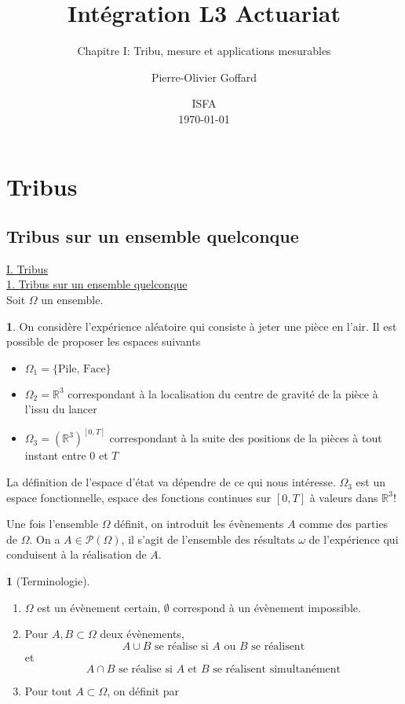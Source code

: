\documentclass[8pt,notheorems]{beamer}
\title[]{Intégration L3 Actuariat}
\subtitle{Chapitre I: Tribu, mesure et applications mesurables}
\author{Pierre-Olivier Goffard}
\institute{
	   Université de Lyon 1\\
	ISFA\\
	   \texttt{pierre-olivier.goffard@univ-lyon1.fr}
	  }
\date{
ISFA\\
\today}
\def \R{\mathbb R}
\theoremstyle{definition}
\newtheorem{definition}{\translate{Definition}}
\theoremstyle{example}
\newtheorem{example}{\translate{Exemple}}
\theoremstyle{mystyle}
\theoremstyle{plain}
\begin{document}
\frame{\titlepage}


\section{Tribus}
\subsection{Tribus sur un ensemble quelconque}
\begin{frame}[allowframebreaks]
\underline{I. Tribus}\\

\underline{1. Tribus sur un ensemble quelconque}\\
Soit $\Omega$ un ensemble. 
\begin{example}
On considère l'expérience aléatoire qui consiste à jeter une pièce en l'air. Il est possible de proposer les espaces suivants
\begin{itemize}
    \item $\Omega_1 = \{\text{Pile, Face}\}$
    \item $\Omega_2 = \R^3$ correspondant à la localisation du centre de gravité de la pièce à l'issu du lancer
    \item $\Omega_3 = \left(\R^{3}\right)^{[0,T]}$ correspondant à la suite des positions de la pièces à tout instant entre $0$ et $T$
\end{itemize}
La définition de l'espace d'état va dépendre de ce qui nous intéresse. $\Omega_3$ est un espace fonctionnelle, espace des fonctions continues sur $[0,T]$ à valeurs dans $\R^3$!
\end{example}
Une fois l'ensemble $\Omega$ définit, on introduit les évènements $A$ comme des parties de $\Omega$. On a $A\in \mathcal{P}(\Omega)$, il s'agit de l'ensemble des résultats $\omega$ de l'expérience qui conduisent à la réalisation de $A$.
\begin{definition}[Terminologie]
\begin{enumerate}
    \item $\Omega$ est un évènement certain, $\emptyset$ correspond à un évènement impossible.
    \item Pour $A, B\subset \Omega$ deux évènements,
    $$
    A\cup B\text{ se réalise  si $A$ ou $B$ se réalisent}
    $$  
    et
    $$
    A\cap B\text{ se réalise  si $A$ et $B$ se réalisent simultanément}
    $$  
    \item Pour tout $A\subset \Omega$, on définit par 
    $$
$$
\end{enumerate}
\end{definition}
\end{frame}
\end{document}
